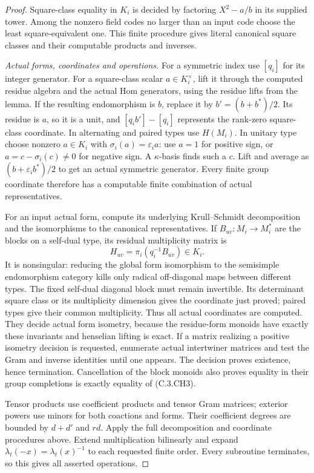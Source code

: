 \begin{proof}
Square-class equality in $K_i$ is
decided by factoring $X^2-a/b$ in
its supplied tower.  Among the
nonzero field codes no larger than
an input code choose the least
square-equivalent one.  This finite
procedure gives literal canonical
square classes and their computable
products and inverses.

\emph{Actual forms, coordinates and operations.}
For a symmetric index use $[q_i]$
for its integer generator.
For a square-class scalar $a\in K_i^\times$,
lift it through the computed residue
algebra and the actual Hom generators,
using the residue lifts from the lemma.
If the resulting endomorphism is $b$,
replace it by $b'=(b+b^*)/2$.
Its residue is $a$, so it is a unit,
and $[q_i b']-[q_i]$ represents the
rank-zero square-class coordinate.
In alternating and paired types
use $H(M_i)$.
In unitary type choose nonzero
$a\in K_i$ with
$\sigma_i(a)=\varepsilon_i a$:
use $a=1$ for positive sign, or
$a=c-\sigma_i(c)\ne0$ for negative
sign.  A $\kappa$-basis finds such
a $c$.  Lift and average as
$(b+\varepsilon_i b^*)/2$ to get
an actual symmetric generator.
Every finite group coordinate
therefore has a computable finite
combination of actual representatives.

For an input actual form, compute
its underlying Krull--Schmidt
decomposition and the isomorphisms
to the canonical representatives.
If $B_{uv}:M_i\to M_i^*$ are the
blocks on a self-dual type, its
residual multiplicity matrix is
\[
       H_{uv}=\pi_i(q_i^{-1}B_{uv})\in K_i.              \tag{C.3.CH5}
\]
It is nonsingular: reducing the
global form isomorphism to the
semisimple endomorphism category
kills only radical off-diagonal
maps between different types.
The fixed self-dual diagonal
block must remain invertible.
Its determinant square class
or its multiplicity dimension
gives the coordinate just proved;
paired types give their common
multiplicity.  Thus all actual
coordinates are computed.
They decide actual form isometry,
because the residue-form monoids
have exactly these invariants
and henselian lifting is exact.
If a matrix realizing a positive
isometry decision is requested,
enumerate actual intertwiner
matrices and test the Gram and
inverse identities until one
appears.  The decision proves
existence, hence termination.
Cancellation of the block monoids
also proves equality in their
group completions is exactly
equality of (C.3.CH3).

Tensor products use coefficient
products and tensor Gram matrices;
exterior powers use minors for
both coactions and forms.
Their coefficient degrees are
bounded by $d+d'$ and $rd$.
Apply the full decomposition
and coordinate procedures above.
Extend multiplication bilinearly
and expand
$\lambda_t(-x)=\lambda_t(x)^{-1}$
to each requested finite order.
Every subroutine terminates, so
this gives all asserted operations.
\end{proof}

